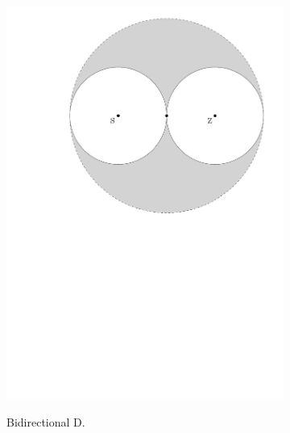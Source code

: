 \documentclass[12pt,a4paper]{article}
\begin{document}
\begin{figure}[h]
\begin{subfigure}{0.30\textwidth}
\includegraphics[width = \textwidth]{../media/bidijkstra.pdf} \\
\caption{Bidirectional D.}
\label{fig:biD}
\end{subfigure}
\begin{subfigure}{0.30\textwidth}
\centering
\vspace{1.1cm}

\end{subfigure}
\end{figure}
\end{document}

